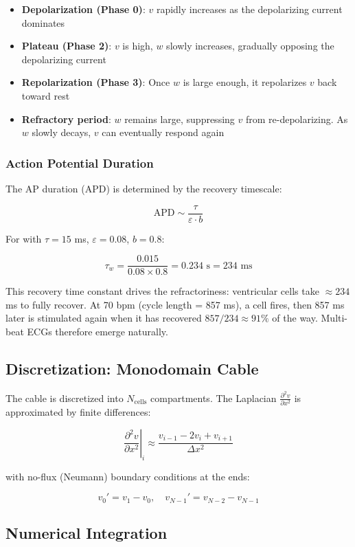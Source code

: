 \documentclass[12pt,a4paper,oneside]{book}
\begin{document}
\begin{itemize}
    \item \textbf{Depolarization (Phase 0)}: $v$ rapidly increases as the depolarizing current dominates
    \item \textbf{Plateau (Phase 2)}: $v$ is high, $w$ slowly increases, gradually opposing the depolarizing current
    \item \textbf{Repolarization (Phase 3)}: Once $w$ is large enough, it repolarizes $v$ back toward rest
    \item \textbf{Refractory period}: $w$ remains large, suppressing $v$ from re-depolarizing. As $w$ slowly decays, $v$ can eventually respond again
\end{itemize}

\subsubsection{Action Potential Duration}

The AP duration (APD) is determined by the recovery timescale:

$$\text{APD} \sim \frac{\tau}{\varepsilon \cdot b}$$

For \phaseIII with $\tau = 15$ ms, $\varepsilon = 0.08$, $b = 0.8$:

$$\tau_w = \frac{0.015}{0.08 \times 0.8} = 0.234 \text{ s} = 234 \text{ ms}$$

This recovery time constant drives the refractoriness: ventricular cells take $\approx 234$ ms to fully recover. At 70 bpm (cycle length = 857 ms), a cell fires, then 857 ms later is stimulated again when it has recovered $857 / 234 \approx 91\%$ of the way. Multi-beat ECGs therefore emerge naturally.

\subsection{Discretization: Monodomain Cable}

The cable is discretized into $N_{\text{cells}}$ compartments. The Laplacian $\frac{\partial^2 v}{\partial x^2}$ is approximated by finite differences:

$$\left.\frac{\partial^2 v}{\partial x^2}\right|_i \approx \frac{v_{i-1} - 2v_i + v_{i+1}}{\Delta x^2}$$

with no-flux (Neumann) boundary conditions at the ends:

$$v_0' = v_1 - v_0, \quad v_{N-1}' = v_{N-2} - v_{N-1}$$

\subsection{Numerical Integration}
\end{document}
